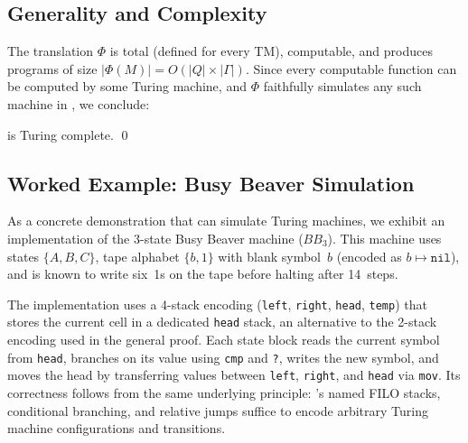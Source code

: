 \subsection{Generality and Complexity}
\label{sec:results:turing:generality}

The translation $\Phi$ is total (defined for every TM), computable, and produces programs of size $|\Phi(M)| = O(|Q| \times |\Gamma|)$. Since every computable function can be computed by some Turing machine, and $\Phi$ faithfully simulates any such machine in \sculpt, we conclude:

\begin{theorem}
\sculpt is Turing complete. \qed
\end{theorem}

\subsection{Worked Example: Busy Beaver Simulation}
\label{sec:results:turing:busybeaver}

As a concrete demonstration that \sculpt can simulate Turing machines, we exhibit an implementation of the 3-state Busy Beaver machine ($BB_3$). This machine uses states $\{A, B, C\}$, tape alphabet $\{b, 1\}$ with blank symbol~$b$ (encoded as $b \mapsto \texttt{nil}$), and is known to write six~1s on the tape before halting after 14~steps.

The implementation uses a 4-stack encoding (\texttt{left}, \texttt{right}, \texttt{head}, \texttt{temp}) that stores the current cell in a dedicated \texttt{head} stack, an alternative to the 2-stack encoding used in the general proof. Each state block reads the current symbol from \texttt{head}, branches on its value using \texttt{cmp} and \texttt{?}, writes the new symbol, and moves the head by transferring values between \texttt{left}, \texttt{right}, and \texttt{head} via \texttt{mov}. Its correctness follows from the same underlying principle: \sculpt's named FILO stacks, conditional branching, and relative jumps suffice to encode arbitrary Turing machine configurations and transitions.


